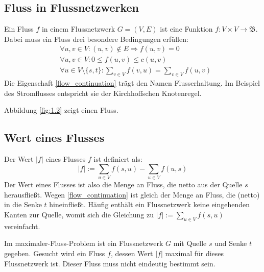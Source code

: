 \documentclass[12pt,a4paper,titlepage,onecolumn,ngerman]{scrartcl}
\begin{document}
\subsection{Fluss in Flussnetzwerken}
Ein Fluss $f$ in einem Flussnetzwerk $G=(V,E)$ ist eine Funktion $f: V \times V \to \mathfrak{B}$.
Dabei muss ein Fluss drei besondere Bedingungen erfüllen:
\begin{align}
&\forall u,v\in V\colon (u,v)\notin E\Rightarrow f(u,v) = 0 \label{only_on_edges} \\
&\forall u,v\in V\colon 0\leq f(u,v)\leq c(u,v) \label{limited_by_capacity} \\
&\forall u\in V\setminus\{s,t\}\colon\sum_{v\in V} f(v,u) = \sum_{v\in V} f(u,v) \label{flow_continuation}
\end{align}
Die Eigenschaft \eqref{flow_continuation} trägt den Namen Flusserhaltung. 
Im Beispiel des Stromflusses entspricht sie der Kirchhoffschen Knotenregel.

Abbildung \ref{fig:1.2} zeigt einen Fluss.

\subsection{Wert eines Flusses}
Der Wert $\lvert f \rvert$ eines Flusses $f$ ist definiert als:
\begin{equation}\label{flow_value}
\lvert f \rvert := \sum_{u\in V} f(s,u) - \sum_{u\in V} f(u,s)
\end{equation}
Der Wert eines Flusses ist also die Menge an Fluss, die \glqq netto\grqq{} aus der Quelle $s$ herausfließt.
Wegen \eqref{flow_continuation} ist gleich der Menge an Fluss, die (\glqq netto\grqq{}) in die Senke $t$ hineinfließt.
Häufig enthält ein Flussnetzwerk keine eingehenden Kanten zur Quelle, womit sich die Gleichung zu $\lvert f \rvert := \sum_{u\in V} f(s,u)$ vereinfacht.

Im maximaler-Fluss-Problem ist ein Flussnetzwerk $G$ mit Quelle $s$ und Senke $t$ gegeben.
Gesucht wird ein Fluss $f$, dessen Wert $\lvert f\rvert$ maximal für dieses Flussnetzwerk ist.
Dieser Fluss muss nicht eindeutig bestimmt sein. %
\end{document}
